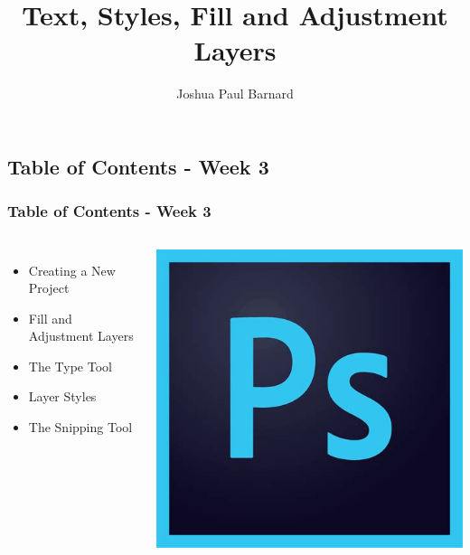 \documentclass{beamer}
\title{Text, Styles, Fill and Adjustment Layers}
\author{Joshua Paul Barnard}
\date{\vspace{-5em}}
\begin{document}
	{
		\begin{frame}
			\vspace{-35pt}
			\maketitle
		\end{frame}
	}

	\section{}	
\subsection{Table of Contents - Week 3}
\begin{frame}
	\frametitle{Table of Contents - Week 3}
	\begin{columns}
		\column{.6\textwidth}
		\vspace{-25pt}
		\begin{itemize}
			\item Creating a New Project
			\item Fill and Adjustment Layers
			\item The Type Tool
			\item Layer Styles
			\item The Snipping Tool
		\end{itemize}
		\column{.45\textwidth}
		\includegraphics[width=.85\textwidth]{images/ps.jpg}
	\end{columns}
\end{frame}
\end{document}
